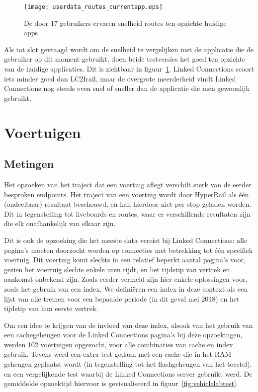 \begin{figure}[ht]
	\centering
	\texttt{[image: userdata\_routes\_currentapp.eps]}
	\caption[Door gebruikers ervaren snelheid routes tov huidige apps]{De door 17 gebruikers ervaren snelheid routes ten opzichte huidige apps }
	\label{fig:relativePerceptionRoutes}
\end{figure}

Als tot slot gevraagd wordt om de snelheid te vergelijken met de applicatie die de gebruiker op dit moment gebruikt, doen beide testversies het goed ten opzichte van de huidige applicaties. Dit is zichtbaar in figuur~\ref{fig:relativePerceptionRoutes}. Linked Connections scoort iets minder goed dan LC2Irail, maar de overgrote meerderheid vindt Linked Connections nog steeds even snel of sneller dan de applicatie die men gewoonlijk gebruikt.

\section{Voertuigen}

\subsection{Metingen}
Het opzoeken van het traject dat een voertuig aflegt verschilt sterk van de eerder besproken endpoints. Het traject van een voertuig wordt door HyperRail als één (ondeelbaar) resultaat beschouwd, en kan hierdoor niet per stop geladen worden. Dit in tegenstelling tot liveboards en routes, waar er verschillende resultaten zijn die elk onafhankelijk van elkaar zijn.

Dit is ook de opzoeking die het meeste data vereist bij Linked Connections: alle pagina's moeten doorzocht worden op connecties met betrekking tot één specifiek voertuig. Dit voertuig komt slechts in een relatief beperkt aantal pagina's voor, gezien het voertuig slechts enkele uren rijdt, en het tijdstip van vertrek en aankomst onbekend zijn. Zoals eerder vermeld %
zijn hier enkele oplossingen voor, zoals het gebruik van een index. We definiëren een index in deze context als een lijst van alle treinen voor een bepaalde periode (in dit geval mei 2018) en het tijdstip van hun eerste vertrek.

Om een idee te krijgen van de invloed van deze index, alsook van het gebruik van een cachegeheugen voor de Linked Connections pagina's bij deze opzoekingen, werden 102 voertuigen opgezocht, voor alle combinaties van cache en index gebruik. Tevens werd een extra test gedaan met een cache die in het RAM-geheugen geplaatst wordt (in tegenstelling tot het flashgeheugen van het toestel), en een vergelijkende test waarbij de Linked Connections server gebruikt werd. De gemiddelde opzoektijd hiervoor is gevisualiseerd in figuur~\ref{fig:vehiclelabtest}.

